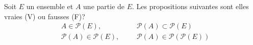 Soit $E$ un ensemble et $A$ une partie de $E$. Les propositions suivantes sont elles vraies (V) ou fausses (F)?
\begin{align*}
  &A \in \mathcal{P}(E), & & &\mathcal{P}(A) \subset \mathcal{P}(E) \\
  &\mathcal{P}(A) \in \mathcal{P}(E), & & &\mathcal{P}(A) \in \mathcal{P}\left( \mathcal{P}(E)\right) 
\end{align*}

